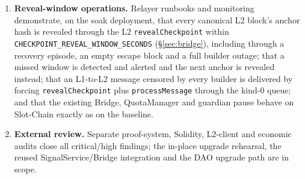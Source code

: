 \documentclass[a4paper,11pt]{article}
\newcommand{\code}[1]{\nolinkurl{#1}}
\begin{document}
\begin{enumerate}
from a second independently operated archive, and verifies it against the
retained ForcedQueue root/count.
\item \textbf{Reveal-window operations.} Relayer runbooks and monitoring
demonstrate, on the soak deployment, that every canonical L2 block's anchor
hash is revealed through the L2 \code{revealCheckpoint} within
\code{CHECKPOINT_REVEAL_WINDOW_SECONDS} (\S\ref{sec:bridge}), including through
a recovery episode, an empty escape block and a full builder outage; that a
missed window is detected and alerted and the next anchor is revealed instead;
that an L1-to-L2 message censored by every builder is delivered by forcing
\code{revealCheckpoint} plus \code{processMessage} through the kind-0 queue;
and that the existing Bridge, QuotaManager and guardian pause behave on
Slot-Chain exactly as on the baseline.
\item \textbf{External review.} Separate proof-system, Solidity, L2-client and
economic audits close all critical/high findings; the in-place upgrade
rehearsal, the reused SignalService/Bridge integration and the DAO upgrade
path are in scope.
\end{enumerate}
\end{document}
